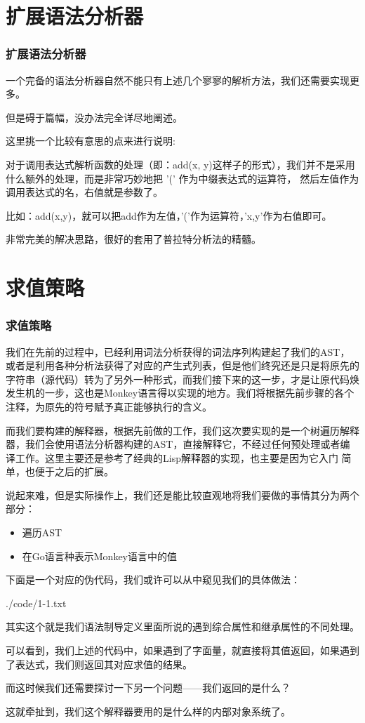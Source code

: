 \documentclass{beamer}
\begin{document}
	\section{扩展语法分析器}
	\begin{frame}
		\frametitle{扩展语法分析器}
		一个完备的语法分析器自然不能只有上述几个寥寥的解析方法，我们还需要实现更多。
		
		但是碍于篇幅，没办法完全详尽地阐述。
		
		这里挑一个比较有意思的点来进行说明:
		
		对于调用表达式解析函数的处理（即：add(x, y)这样子的形式），我们并不是采用什么额外的处理，而是非常巧妙地把 '(' 作为中缀表达式的运算符，
		然后左值作为调用表达式的名，右值就是参数了。
		
		比如：add(x,y)，就可以把add作为左值，'('作为运算符，'x,y'作为右值即可。
		
		非常完美的解决思路，很好的套用了普拉特分析法的精髓。
	\end{frame}
	\section{求值策略}
	\begin{frame}
		\frametitle{求值策略}
		我们在先前的过程中，已经利用词法分析获得的词法序列构建起了我们的AST，或者是利用各种分析法获得了对应的产生式列表，但是他们终究还是只是将原先的字符串（源代码）转为了另外一种形式，而我们接下来的这一步，才是让原代码焕发生机的一步，这也是Monkey语言得以实现的地方。我们将根据先前步骤的各个注释，为原先的符号赋予真正能够执行的含义。
		
		而我们要构建的解释器，根据先前做的工作，我们这次要实现的是一个树遍历解释器，我们会使用语法分析器构建的AST，直接解释它，不经过任何预处理或者编译工作。这里主要还是参考了经典的Lisp解释器的实现，也主要是因为它入门
		简单，也便于之后的扩展。
	\end{frame}
	\begin{frame}
		说起来难，但是实际操作上，我们还是能比较直观地将我们要做的事情其分为两个部分：
		\begin{itemize}
			\item 遍历AST
			\item 在Go语言种表示Monkey语言中的值
		\end{itemize}
	
		下面是一个对应的伪代码，我们或许可以从中窥见我们的具体做法：
		
		{./code/1-1.txt}
	\end{frame}
	\begin{frame}
		其实这个就是我们语法制导定义里面所说的遇到综合属性和继承属性的不同处理。
		
		可以看到，我们上述的代码中，如果遇到了字面量，就直接将其值返回，如果遇到了表达式，我们则返回其对应求值的结果。
		
		而这时候我们还需要探讨一下另一个问题——我们返回的是什么？
		
		这就牵扯到，我们这个解释器要用的是什么样的内部对象系统了。
	\end{frame}
\end{document}

